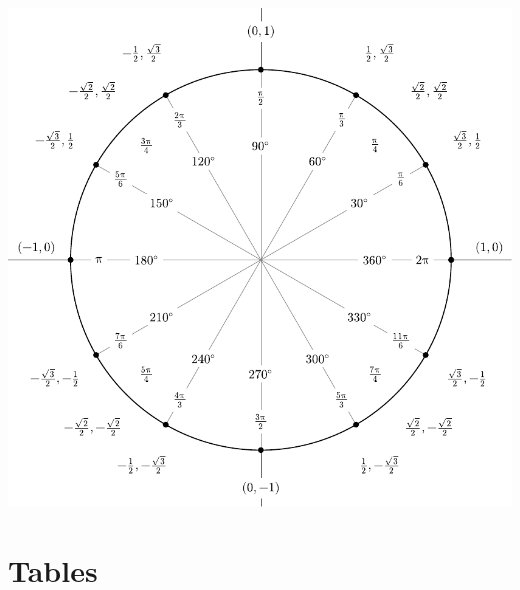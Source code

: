 \documentclass[a4paper,fontsize = 8pt]{scrartcl}
\begin{document}
\begin{center}
  \includegraphics[width=\linewidth]{include_degrees_circle.pdf}
  
\end{center}

\section{Tables}
\end{document}
